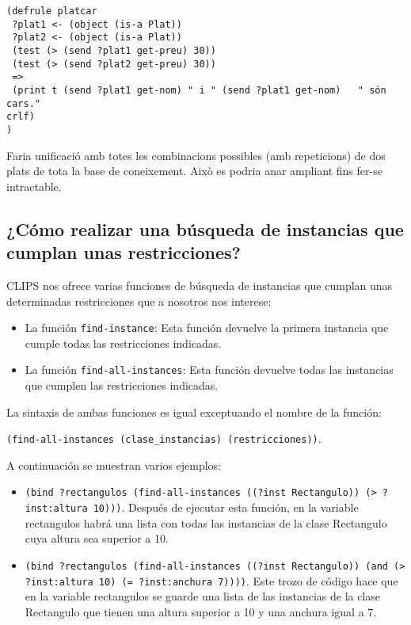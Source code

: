 \documentclass[11pt,svgnames]{scrbook}
\begin{document}
\begin{verbatim}
(defrule platcar
 ?plat1 <- (object (is-a Plat))
 ?plat2 <- (object (is-a Plat))
 (test (> (send ?plat1 get-preu) 30))
 (test (> (send ?plat2 get-preu) 30))
 =>
 (print t (send ?plat1 get-nom) " i " (send ?plat1 get-nom)   " són cars."
crlf)
)
\end{verbatim} 

Faria unificació amb totes les combinacions possibles (amb repeticions) de dos
plats de tota la base de coneixement. Això es podria anar ampliant fins fer-se
intractable.


\subsection{¿Cómo realizar una búsqueda de instancias que cumplan unas
restricciones?}

CLIPS nos ofrece varias funciones de búsqueda de instancias que cumplan unas
determinadas restricciones que a nosotros nos interese:

\begin{itemize}
\item 
La función \texttt{find-instance}: Esta función devuelve la primera instancia
que cumple
todas las restricciones indicadas. 
\item La función \texttt{find-all-instances}: Esta función devuelve todas las
instancias que
cumplen las restricciones indicadas.
\end{itemize}

La sintaxis de ambas funciones es igual exceptuando el nombre de la función:

\texttt{(find-all-instances (clase\_instancias) (restricciones))}. 

A continuación se muestran varios ejemplos:

\begin{itemize}
\item 
\texttt{(bind ?rectangulos (find-all-instances ((?inst Rectangulo)) (>
?inst:altura
10)))}.  Después de ejecutar esta función, en la variable rectangulos habrá una
lista con todas las instancias de la clase Rectangulo cuya altura sea superior a
10. 

\item \texttt{(bind ?rectangulos (find-all-instances ((?inst Rectangulo)) (and
(>
?inst:altura
10) (= ?inst:anchura 7))))}. Este trozo de código hace que en la variable
rectangulos se guarde una lista de las instancias de la clase Rectangulo que
tienen una altura superior a 10 y una anchura igual a 7.\end{itemize}
\end{document}
